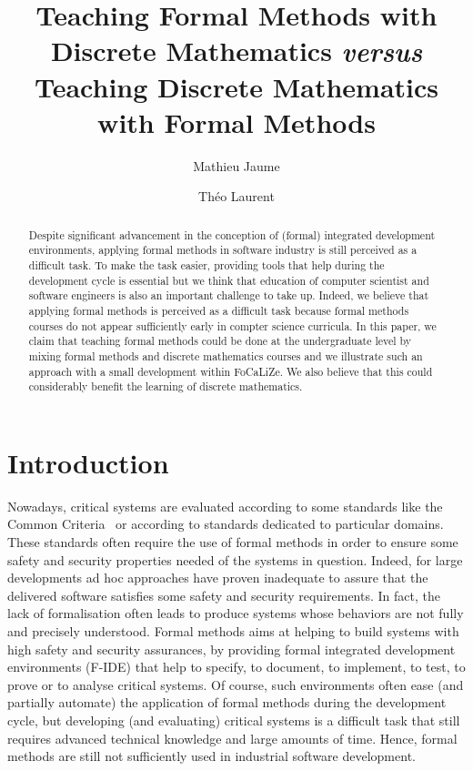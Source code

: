 \documentclass[submission,copyright,creativecommons]{eptcs}
\title{Teaching Formal Methods with Discrete Mathematics  {\it versus} 
  Teaching Discrete Mathematics with Formal Methods}
\author{Mathieu Jaume
\institute{Sorbonne Universit\'es, UPMC Univ. Paris 06 \\ UMR 7606 ,
  LIP6 \\  F-75005, Paris, France}
\email{Mathieu.Jaume@lip6.fr}
\and Th\'eo Laurent
\institute{Sorbonne Universit\'es, UPMC Univ. Paris 06 \\ F-75005, Paris, France}
\email{Theo.Laurent@etu.upmc.fr}
}
\begin{document}
\maketitle

\begin{abstract}
Despite significant advancement in the conception of (formal) integrated
development environments,
applying formal methods in software industry is still perceived as
a difficult task. To make the task easier, providing tools that help
during the development cycle is essential but we think that
education of computer scientist and software engineers is also an
important challenge to take up. Indeed, we believe that applying formal methods 
is perceived as a difficult task because
formal methods courses 
do not appear sufficiently early in compter science curricula. In this
paper, we claim that teaching formal methods could be done at the
undergraduate level by mixing formal methods and discrete mathematics
courses and we illustrate such an approach with a small development within FoCaLiZe.
We also believe that this could considerably benefit the learning of
discrete mathematics. 
\end{abstract}

\section{Introduction}


Nowadays,
critical systems are evaluated according to some standards like the
Common Criteria~\cite{CC2} or
according to standards dedicated
to particular domains.
These standards often
require the use of formal methods in order to ensure some safety and
security properties needed of the systems in question.
Indeed, for large developments ad hoc approaches have proven inadequate to assure
that the delivered software satisfies some safety and security
requirements. In fact,
the lack of formalisation often leads to produce systems whose
behaviors are not fully and precisely understood.
Formal methods aims at helping to build systems with high
safety and security assurances,  
by
providing formal integrated development environments (F-IDE) that help to specify, to document,
to implement, to test, to prove or to analyse critical systems.
Of course, such environments often ease
(and partially automate)
the application of formal methods during the development cycle, but
developing (and evaluating) critical systems is a
difficult task that still
requires advanced technical knowledge and large amounts of time.
Hence, formal methods
are still not sufficiently used in industrial software
development. 
\end{document}
